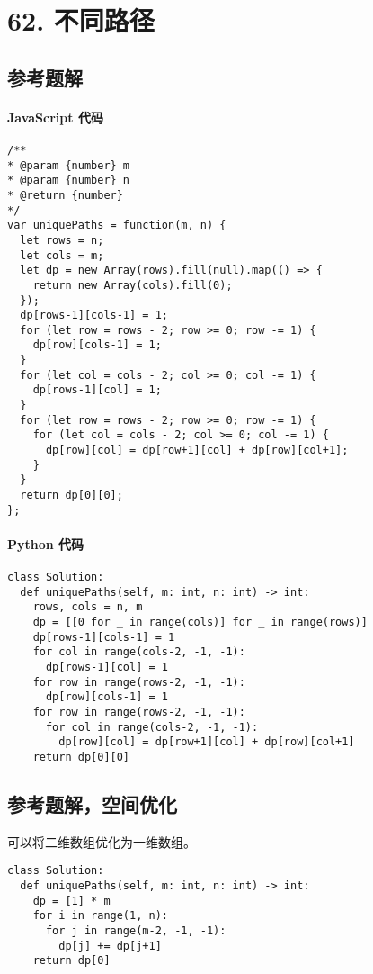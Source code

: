 \newpage
\section{62. 不同路径}
\label{leetcode:62}

\subsection{参考题解}

\paragraph{JavaScript 代码}

\begin{verbatim}
/**
* @param {number} m
* @param {number} n
* @return {number}
*/
var uniquePaths = function(m, n) {
  let rows = n;
  let cols = m;
  let dp = new Array(rows).fill(null).map(() => {
    return new Array(cols).fill(0);
  });
  dp[rows-1][cols-1] = 1;
  for (let row = rows - 2; row >= 0; row -= 1) {
    dp[row][cols-1] = 1;
  }
  for (let col = cols - 2; col >= 0; col -= 1) {
    dp[rows-1][col] = 1;
  }
  for (let row = rows - 2; row >= 0; row -= 1) {
    for (let col = cols - 2; col >= 0; col -= 1) {
      dp[row][col] = dp[row+1][col] + dp[row][col+1];
    }
  }
  return dp[0][0];
};
\end{verbatim}

\paragraph{Python 代码}

\begin{verbatim}
class Solution:
  def uniquePaths(self, m: int, n: int) -> int:
    rows, cols = n, m
    dp = [[0 for _ in range(cols)] for _ in range(rows)]
    dp[rows-1][cols-1] = 1
    for col in range(cols-2, -1, -1):
      dp[rows-1][col] = 1
    for row in range(rows-2, -1, -1):
      dp[row][cols-1] = 1
    for row in range(rows-2, -1, -1):
      for col in range(cols-2, -1, -1):
        dp[row][col] = dp[row+1][col] + dp[row][col+1]
    return dp[0][0]
\end{verbatim}

\subsection{参考题解，空间优化}

可以将二维数组优化为一维数组。

\begin{verbatim}
class Solution:
  def uniquePaths(self, m: int, n: int) -> int:
    dp = [1] * m
    for i in range(1, n):
      for j in range(m-2, -1, -1):
        dp[j] += dp[j+1]
    return dp[0]
\end{verbatim}
